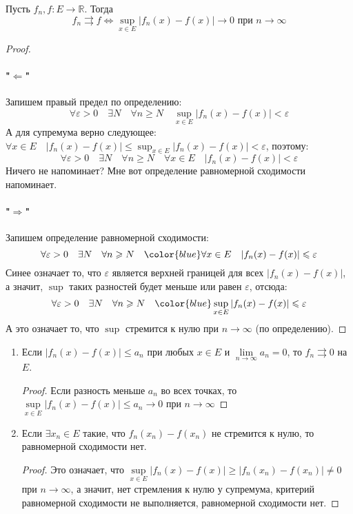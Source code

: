 \begin{theorem} \thmslashn

  Пусть $f_n, f \colon E \to \mathbb{R}$. Тогда
  $$f_n \rightrightarrows f \Leftrightarrow \sup_{x\in E}|f_n(x) - f(x)| \rightarrow 0 \text{ при } n\to \infty$$
  \begin{proof} \thmslashn

    \paragraph{"$\Leftarrow$"} Запишем правый предел по определению:
    $$\forall\varepsilon>0\quad\exists N\quad\forall n \geqslant N\quad \sup_{x\in E}|f_n(x) - f(x)| < \varepsilon$$
    А для супремума верно следующее: $\forall x\in E \quad |f_n(x) - f(x)|\leqslant\sup_{x\in E}|f_n(x) - f(x)|<\varepsilon$, поэтому:
    $$\forall\varepsilon>0\quad\exists N\quad\forall n \geqslant N\quad \forall x\in E \quad |f_n(x) - f(x)|<\varepsilon$$
    Ничего не напоминает? Мне вот определение равномерной сходимости напоминает.
    \paragraph{"$\Rightarrow$"} Запишем определение равномерной сходимости:
    $$\forall \varepsilon > 0 \quad \exists N \quad \forall n \geqslant N\quad {\color{blue}\forall x \in E\quad |f_n(x) - f(x)|\leqslant \varepsilon}$$
    Синее означает то, что $\varepsilon$ является верхней границей для всех $|f_n(x) - f(x)|$, а значит, $\sup$ таких разностей будет меньше или равен $\varepsilon$, отсюда:
    $$\forall \varepsilon > 0 \quad \exists N \quad \forall n \geqslant N\quad {\color{blue}\sup_{x\in E}|f_n(x) - f(x)|\leqslant \varepsilon}$$
    А это означает то, что $\sup$ стремится к нулю при $n\rightarrow\infty$ (по определению).
  \end{proof}
\end{theorem}
\begin{consequence} \thmslashn

  \begin{enumerate}
  \item Если $|f_n(x) - f(x)| \leq a_n$ при любых $x\in E$ и $\lim\limits_{n\rightarrow\infty}a_n = 0$, то $f_n\rightrightarrows 0$ на $E$.
    \begin{proof} \thmslashn

      Если разность меньше $a_n$ во всех точках, то $\sup\limits_{x\in E}|f_n(x) - f(x)| \leqslant a_n\to 0$ при $n\to\infty$
    \end{proof}
  \item Если $\exists x_n\in E$ такие, что $f_n(x_n) - f(x_n)$ не стремится к нулю, то равномерной сходимости нет.  
    \begin{proof} \thmslashn

      Это означает, что $\sup\limits_{x\in E}|f_n(x) - f(x)| \geqslant |f_n(x_n) - f(x_n)| \neq 0$ при $n\rightarrow\infty$, а значит, нет стремления к нулю у супремума, критерий равномерной сходимости не выполняется, равномерной сходимости нет.
    \end{proof}
  \end{enumerate}
\end{consequence}
